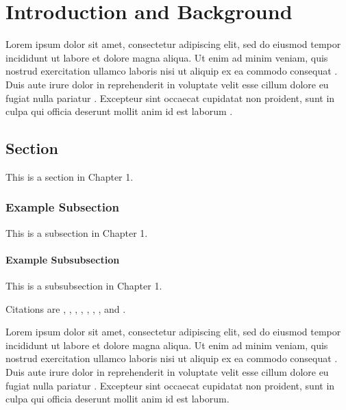 \chapter{Introduction and Background}
\label{chap:introduction}

Lorem ipsum dolor sit amet, consectetur adipiscing elit, sed do eiusmod tempor incididunt ut labore et dolore magna aliqua. Ut enim ad minim veniam, quis nostrud exercitation ullamco laboris nisi ut aliquip ex ea commodo consequat \textcite{ref1}. Duis aute irure dolor in reprehenderit in voluptate velit esse cillum dolore eu fugiat nulla pariatur \textcite{ref2}. Excepteur sint occaecat cupidatat non proident, sunt in culpa qui officia deserunt mollit anim id est laborum \textcite{ref3}.

\section{Section}
\label{sec:sec-1-1}

This is a section in Chapter 1.

\subsection{Example Subsection}
\label{subsec:sec-1-1-1}

This is a subsection in Chapter 1.

\subsubsection{Example Subsubsection}

This is a subsubsection in Chapter 1.

Citations are \textcite{ref1}, \textcite{ref2}, \textcite{ref3}, \textcite{ref4}, 
\textcite{einstein}, \textcite{knuth-fa}, \textcite{dirac}, and \textcite{knuthwebsite}.

Lorem ipsum dolor sit amet, consectetur adipiscing elit, sed do eiusmod tempor incididunt ut labore et dolore magna aliqua. Ut enim ad minim veniam, quis nostrud exercitation ullamco laboris nisi ut aliquip ex ea commodo consequat \textcite{ref1}. Duis aute irure dolor in reprehenderit in voluptate velit esse cillum dolore eu fugiat nulla pariatur \textcite{ref2}. Excepteur sint occaecat cupidatat non proident, sunt in culpa qui officia deserunt mollit anim id est laborum.
